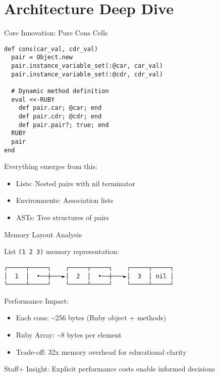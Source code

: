 \documentclass[presentation,aspectratio=169]{beamer}
\begin{document}
\section{Architecture Deep Dive}
\label{sec:orgaa238eb}

\begin{frame}[label={sec:org5cc9034},fragile]{Core Innovation: Pure Cons Cells}
 \begin{verbatim}
def cons(car_val, cdr_val)
  pair = Object.new
  pair.instance_variable_set(:@car, car_val)
  pair.instance_variable_set(:@cdr, cdr_val)

  # Dynamic method definition
  eval <<-RUBY
    def pair.car; @car; end
    def pair.cdr; @cdr; end
    def pair.pair?; true; end
  RUBY
  pair
end
\end{verbatim}

\pause

\alert{Everything emerges from this}:
\begin{itemize}
\item Lists: Nested pairs with nil terminator
\item Environments: Association lists
\item ASTs: Tree structures of pairs
\end{itemize}
\end{frame}
\begin{frame}[label={sec:orgb198a53},fragile]{Memory Layout Analysis}
 \begin{center}
List \texttt{(1 2 3)} memory representation:
\end{center}

\begin{verbatim}
┌─────┬─────┐    ┌─────┬─────┐    ┌─────┬─────┐
│  1  │  •──┼───►│  2  │  •──┼───►│  3  │ nil │
└─────┴─────┘    └─────┴─────┘    └─────┴─────┘
\end{verbatim}

\pause

\alert{Performance Impact}:
\begin{itemize}
\item Each cons: \textasciitilde{}256 bytes (Ruby object + methods)
\item Ruby Array: \textasciitilde{}8 bytes per element
\item \alert{Trade-off}: 32x memory overhead for educational clarity
\end{itemize}

\pause

\alert{Staff+ Insight}: Explicit performance costs enable informed decisions
\end{frame}
\end{document}
